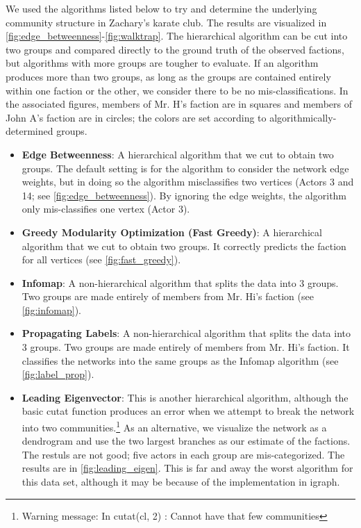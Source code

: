 We used the algorithms listed below to try and determine the underlying community structure in Zachary's karate club. The results are visualized in \cref{fig:edge_betweenness}-\cref{fig:walktrap}. The hierarchical algorithm can be cut into two groups and compared directly to the ground truth of the observed factions, but algorithms with more groups are tougher to evaluate. If an algorithm produces more than two groups, as long as the groups are contained entirely within one faction or the other, we consider there to be no mis-classifications. In the associated figures, members of Mr. H's faction are in squares and members of John A's faction are in circles; the colors are set according to algorithmically-determined groups.
\begin{itemize}
\item \textbf{Edge Betweenness}: A hierarchical algorithm that we cut to obtain two groups. The default setting is for the algorithm to consider the network edge weights, but in doing so the algorithm misclassifies two vertices (Actors 3 and 14; see \cref{fig:edge_betweenness}). By ignoring the edge weights, the algorithm only mis-classifies one vertex (Actor 3). 
\item \textbf{Greedy Modularity Optimization (Fast Greedy)}: A hierarchical algorithm that we cut to obtain two groups. It correctly predicts the faction for all vertices (see \cref{fig:fast_greedy}).
\item \textbf{Infomap}: A non-hierarchical algorithm that splits the data into 3 groups. Two groups are made entirely of members from Mr. Hi's faction (see \cref{fig:infomap}).
\item \textbf{Propagating Labels}: A non-hierarchical algorithm that splits the data into 3 groups. Two groups are made entirely of members from Mr. Hi's faction. It classifies the networks into the same groups as the Infomap algorithm (see \cref{fig:label_prop}).  
\item \textbf{Leading Eigenvector}: This is another hierarchical algorithm, although the basic \textsf{cutat} function produces an error when we attempt to break the network into two communities.\footnote{\textsf{Warning message: In cutat(cl, 2) : Cannot have that few communities}} As an alternative, we visualize the network as a dendrogram and use the two largest branches as our estimate of the factions. The restuls are not good; five actors in each group are mis-categorized. The results are in \cref{fig:leading_eigen}. This is far and away the worst algorithm for this data set, although it may be because of the implementation in \textsf{igraph}.

\end{itemize}
